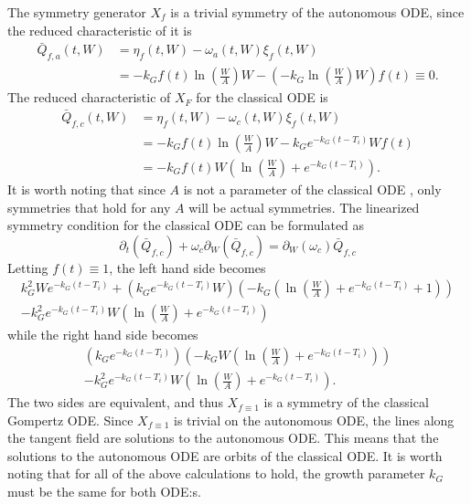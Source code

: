 The symmetry generator \(X_f\) is a trivial symmetry of the autonomous ODE, since the reduced characteristic of it is
\begin{align}
  \bar{Q}_{f,a}(t, W) &= \eta_f(t, W) - \omega_a(t, W) \xi_f(t, W)\\
  &= - k_G f(t) \ln(\frac{W}{A}) W - \left(-k_G \ln(\frac{W}{A}) W \right) f(t) \equiv 0.
\end{align}
The reduced characteristic of \(X_F\) for the classical ODE is
\begin{align}
  \bar{Q}_{f,c}(t, W) &= \eta_f(t, W) - \omega_c(t, W) \xi_f(t, W)\\
  &= - k_G f(t) \ln(\frac{W}{A}) W - k_G e^{-k_G (t - T_i)} W f(t)\\
  &= - k_G f(t) W \left(\ln(\frac{W}{A}) + e^{-k_G (t - T_i)}\right).
\end{align}
It is worth noting that since \(A\) is not a parameter of the classical ODE , only symmetries that hold for any \(A\) will be actual symmetries.
The linearized symmetry condition for the classical ODE can be formulated as
\begin{equation}
  \partial_t(\bar{Q}_{f,c}) + \omega_c \partial_W(\bar{Q}_{f,c}) = \partial_W(\omega_c) \bar{Q}_{f,c}
\end{equation}
Letting \(f(t) \equiv 1\), the left hand side becomes
\begin{gather}
  k_G^2 W e^{-k_G (t - T_i)} + \left(k_G e^{-k_G (t - T_i)} W\right) \left(-k_G \left(\ln(\frac{W}{A}) + e^{-k_G (t - T_i)} + 1\right)\right)\\
  -k_G^2 e^{-k_G (t - T_i)} W\left(\ln(\frac{W}{A}) + e^{-k_G (t - T_i)}\right)
\end{gather}
while the right hand side becomes
\begin{gather}
  \left(k_G e^{-k_G (t - T_i)}\right) \left(- k_G W \left(\ln(\frac{W}{A}) + e^{-k_G (t - T_i)}\right)\right)\\
  -k_G^2 e^{-k_G (t - T_i)} W \left(\ln(\frac{W}{A}) + e^{-k_G (t - T_i)}\right).
\end{gather}
The two sides are equivalent, and thus \(X_{f\equiv1}\) is a symmetry of the classical Gompertz ODE.
Since \(X_{f\equiv1}\) is trivial on the autonomous ODE, the lines along the tangent field are solutions to the autonomous ODE.
This means that the solutions to the autonomous ODE are orbits of the classical ODE.
It is worth noting that for all of the above calculations to hold, the growth parameter \(k_G\) must be the same for both ODE:s.

